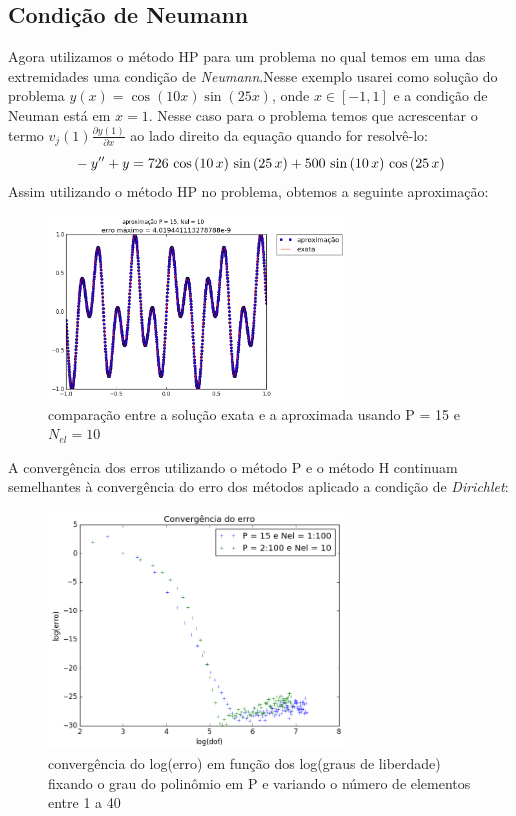 \subsection{Condição de Neumann}
 Agora utilizamos o método HP para um problema no qual temos em uma das extremidades uma condição de \emph{Neumann}.Nesse exemplo usarei como solução do problema $y(x) = \cos(10 x) \sin(25 x)$, onde $ x \in [-1,1]$ e a condição de Neuman está em $x=1$. Nesse caso para o problema temos que acrescentar o termo  $v_j(1) \frac{\partial y(1)}{\partial x}$  ao lado direito da equação quando for resolvê-lo:
\begin{equation}
\\-y'' + y = 726\,\cos \left(10\,x\right)\,\sin \left(25\,x\right)+500\,\sin 
 \left(10\,x\right)\,\cos \left(25\,x\right) 
\end{equation}
 Assim utilizando o método HP no problema, obtemos a seguinte aproximação:
\begin{figure}[H]
\centering
\includegraphics[width=0.7\textwidth,center]{figuras/Neumm_10_15.png}
\caption{comparação entre a solução exata e a aproximada usando P = 15 e $N_{el} = 10$ } 
\end{figure}
A convergência dos erros utilizando o método P e o método H continuam semelhantes à convergência do erro dos métodos aplicado a condição de \emph{Dirichlet}:
\begin{figure}[H]
\centering
\includegraphics[width=0.7\textwidth,center]{figuras/convergencia_erro_Neumm.png}
\caption{convergência do log(erro) em função dos log(graus de liberdade) fixando o grau do polinômio em P e variando o número de elementos entre 1 a 40 } 
\end{figure}
